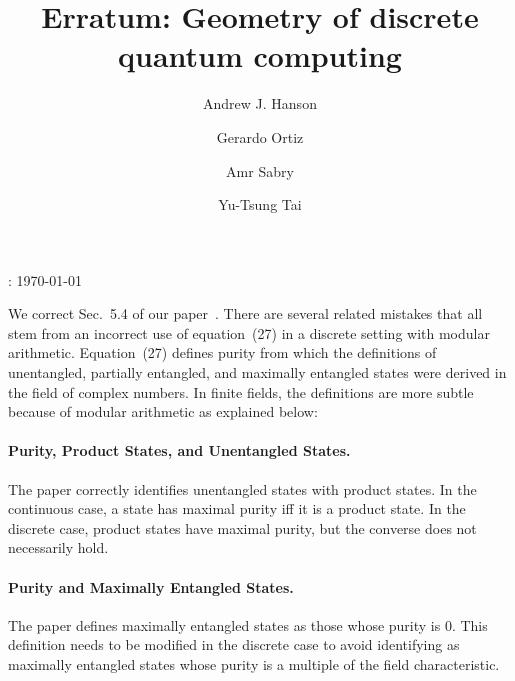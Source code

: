 \documentclass{iopart}
\begin{document}
\title{Erratum: Geometry of discrete quantum computing}


\author{Andrew J. Hanson}


\address{School of Informatics and Computing, Indiana University, Bloomington,
IN 47405, U.S.A}


\author{Gerardo Ortiz}


\address{Department of Physics, Indiana University, Bloomington, IN 47405,
U.S.A}


\author{Amr Sabry}


\address{School of Informatics and Computing, Indiana University, Bloomington,
IN 47405, U.S.A}


\author{Yu-Tsung Tai}


\address{Department of Mathematics, Indiana University, Bloomington, IN 47405,
U.S.A}


\address{School of Informatics and Computing, Indiana University, Bloomington,
IN 47405, U.S.A}


: {\today}

\maketitle

\noindent We correct Sec.~5.4 of our paper~\cite{geometry}. There are several related mistakes that all stem from an incorrect use of equation~(27) in a discrete setting with modular arithmetic. Equation~(27) defines purity from which the definitions of unentangled, partially entangled, and maximally entangled states were derived in the field of complex numbers. In finite fields, the definitions are more subtle because of modular arithmetic as explained below:

\paragraph*{Purity, Product States, and Unentangled States.} The paper correctly identifies unentangled states with product states. In the continuous case, a state has maximal purity iff it is a product state. In the discrete case, product states have maximal purity, but the converse does not necessarily hold. 
\paragraph*{Purity and Maximally Entangled States.} The paper defines maximally entangled states as those whose purity is 0. This definition needs to be modified in the discrete case to avoid identifying as maximally entangled states whose purity is a multiple of the field characteristic.
\end{document}
